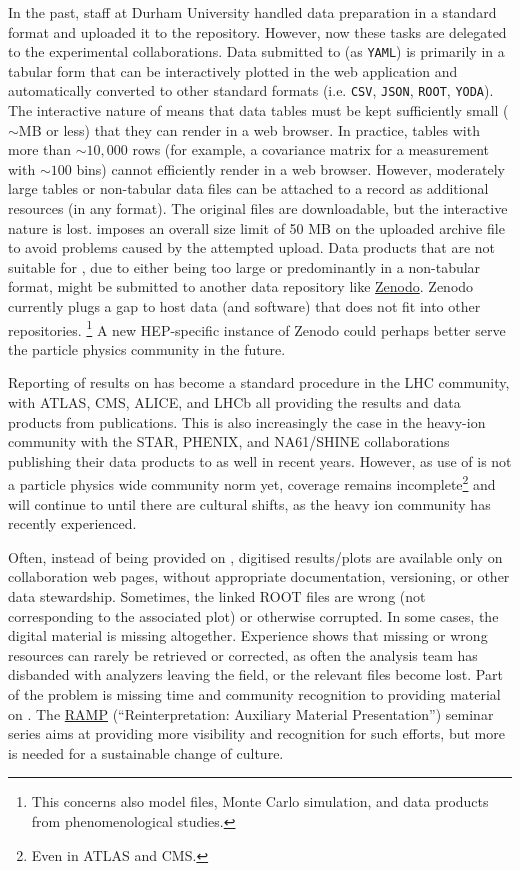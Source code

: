 \documentclass[11pt]{article}
\begin{document}
In the past, \hepdata staff at Durham University handled data preparation in a standard format and uploaded it to the repository.
However, now these tasks are delegated to the experimental collaborations.
Data submitted to \hepdata (as \texttt{YAML}) is primarily in a tabular form that can be interactively plotted in the web application and automatically converted to other standard formats (i.e. \texttt{CSV}, \texttt{JSON}, \texttt{ROOT}, \texttt{YODA}).
The interactive nature of \hepdata means that data tables must be kept sufficiently small ($\sim$MB or less) that they can render in a web browser.
In practice, tables with more than $\sim 10,000$ rows (for example, a covariance matrix for a measurement with $\sim 100$ bins) cannot efficiently render in a web browser.
However, moderately large tables or non-tabular data files can be attached to a \hepdata record as additional resources (in any format).
The original files are downloadable, but the interactive nature is lost.
\hepdata imposes an overall size limit of 50 MB on the uploaded archive file to avoid problems caused by the attempted upload. 
%
Data products that are not suitable for \hepdata, due to either being too large or predominantly in a non-tabular format, might be submitted to another data repository like \href{https://zenodo.org/}{Zenodo}.
Zenodo currently plugs a gap to host data (and software) that does not fit into other repositories.%
\footnote{This concerns also model files, Monte Carlo simulation, and data products from phenomenological studies.}
A new \gls{HEP}-specific instance of Zenodo could perhaps better serve the particle physics community in the future.


Reporting of results on \hepdata has become a standard procedure in the \gls{LHC} community, with \gls{ATLAS}, \gls{CMS}, \gls{ALICE}, and \gls{LHCb} all providing the results and data products from publications.
This is also increasingly the case in the heavy-ion community with the \gls{STAR}, \gls{PHENIX}, and NA61/SHINE collaborations publishing their data products to \hepdata as well in recent years.
However, as use of \hepdata is not a particle physics wide community norm yet, coverage remains incomplete\footnote{Even in \gls{ATLAS} and \gls{CMS}.} and will continue to until there are cultural shifts, as the heavy ion community has recently experienced.

Often, instead of being provided on \hepdata, digitised results/plots are available only on collaboration web pages, without appropriate documentation, versioning, or other data stewardship.
Sometimes, the linked ROOT files are wrong (not corresponding to the associated plot) or otherwise corrupted.
In some cases, the digital material is missing altogether.
Experience shows that missing or wrong resources can rarely be retrieved or corrected, as often the analysis team has disbanded with analyzers leaving the field, or the relevant files become lost. 
Part of the problem is missing time and community recognition to providing material on \hepdata.
The \href{https://indico.cern.ch/category/14155/}{RAMP} (``Reinterpretation: Auxiliary Material Presentation'') seminar series aims at providing more visibility and recognition for such efforts,  but more is needed for a 
sustainable change of culture. 
\end{document}
